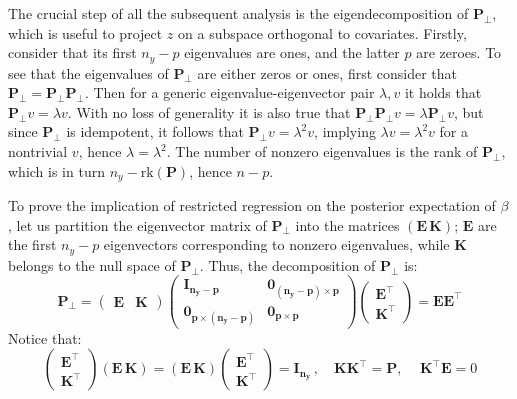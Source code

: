 \documentclass[openany, 11pt, oneside]{book}
\begin{document}
The crucial step of all the subsequent analysis is the eigendecomposition of $\boldsymbol{P_{\bot}}$, which is useful to project $z$ on a subspace orthogonal to covariates. Firstly, consider that its first $n_y-p$ eigenvalues are ones, and the latter $p$ are zeroes. To see that the eigenvalues of $\boldsymbol{P_{\bot}}$ are either zeros or ones, first consider that $\boldsymbol{P_{\bot}} = \boldsymbol{P_{\bot} P_{\bot}}$. Then for a generic eigenvalue-eigenvector pair $\lambda, v$ it holds that $\boldsymbol{P_{\bot}} v = \lambda v$. With no loss of generality it is also true that $\boldsymbol{P_{\bot} P_{\bot}} v = \lambda \boldsymbol{P_{\bot}} v$, but since $\boldsymbol{P_\bot}$ is idempotent, it follows that $\boldsymbol{P_{\bot}} v = \lambda^2 v$, implying $\lambda v = \lambda^2 v$ for a nontrivial $v$, hence $\lambda = \lambda^2$. The number of nonzero eigenvalues is the rank of $\boldsymbol{P_{\bot}}$, which is in turn $n_y - \mathrm{rk}(\boldsymbol{P})$, hence $n-p$. 

To prove the implication of restricted regression on the posterior expectation of $\beta$, let us partition the eigenvector matrix of $\boldsymbol{P_{\bot}}$ into the matrices $(\boldsymbol{E} \, \boldsymbol{K})$; $\boldsymbol{E}$ are the first $n_y-p$ eigenvectors corresponding to nonzero eigenvalues, while $\boldsymbol{K}$ belongs to the null space of $\boldsymbol{P_{\bot}}$. Thus, the decomposition of $\boldsymbol{P_{\bot}}$ is:
%
$$
\boldsymbol{P_{\bot}} =  \begin{pmatrix}\boldsymbol{E} & \boldsymbol{K} \end{pmatrix} 
\begin{pmatrix} \boldsymbol{I_{n_y-p}} & \boldsymbol{0_{(n_y-p) \times p }} \\
  \boldsymbol{0_{p \times (n_y-p)}} & \boldsymbol{0_{p \times p}} \end{pmatrix}
 \begin{pmatrix} \boldsymbol{E}^{\top} \\ \boldsymbol{K}^{\top} \end{pmatrix} 
 = \boldsymbol{E E}^{\top}
$$
%
Notice that:
$$
\begin{pmatrix} \boldsymbol{E}^{\top} \\ \boldsymbol{K}^{\top}\end{pmatrix}
\left(\boldsymbol{E} \, \boldsymbol{K}\right) = \left(\boldsymbol{E} \, \boldsymbol{K} \right) 
\begin{pmatrix} \boldsymbol{E}^{\top} \\ \boldsymbol{K}^{\top}\end{pmatrix}
= \boldsymbol{I_{n_y}} \, , \quad \boldsymbol{KK}^{\top} = \boldsymbol{P}, \, \quad \boldsymbol{K^{\top}E} = 0 
$$
\end{document}
